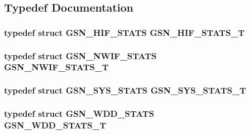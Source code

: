\subsection{Typedef Documentation}
\hypertarget{a00591_a5a7bc0d65205484eed0106fa5ca4fdf5}{
\subsubsection[{GSN\_\-HIF\_\-STATS\_\-T}]{\setlength{\rightskip}{0pt plus 5cm}typedef struct {\bf GSN\_\-HIF\_\-STATS} {\bf GSN\_\-HIF\_\-STATS\_\-T}}}
\label{a00591_a5a7bc0d65205484eed0106fa5ca4fdf5}
\hypertarget{a00591_a69ff6afd3f28a43690172bb64675e2ae}{
\subsubsection[{GSN\_\-NWIF\_\-STATS\_\-T}]{\setlength{\rightskip}{0pt plus 5cm}typedef struct {\bf GSN\_\-NWIF\_\-STATS} {\bf GSN\_\-NWIF\_\-STATS\_\-T}}}
\label{a00591_a69ff6afd3f28a43690172bb64675e2ae}
\hypertarget{a00591_ad30597595cc19608186140676d0969ed}{
\subsubsection[{GSN\_\-SYS\_\-STATS\_\-T}]{\setlength{\rightskip}{0pt plus 5cm}typedef struct {\bf GSN\_\-SYS\_\-STATS} {\bf GSN\_\-SYS\_\-STATS\_\-T}}}
\label{a00591_ad30597595cc19608186140676d0969ed}
\hypertarget{a00591_a8d6b9fca3d17acbf280aa9c7df404600}{
\subsubsection[{GSN\_\-WDD\_\-STATS\_\-T}]{\setlength{\rightskip}{0pt plus 5cm}typedef struct {\bf GSN\_\-WDD\_\-STATS} {\bf GSN\_\-WDD\_\-STATS\_\-T}}}
\label{a00591_a8d6b9fca3d17acbf280aa9c7df404600}
